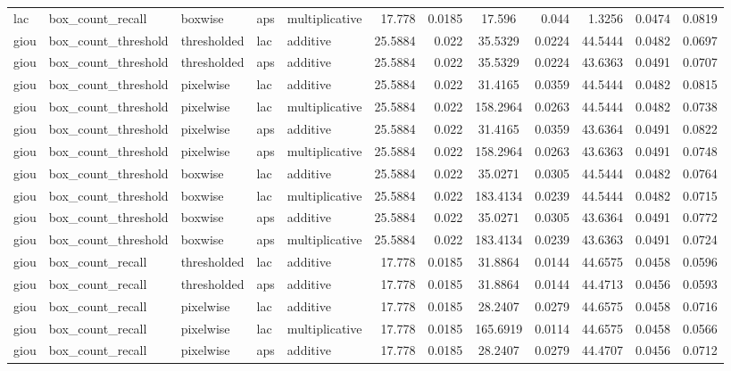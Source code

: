 \begin{table*}[htbp]
\begin{tabular}{@{}lllll rrcrrcr@{}}
lac & box\_count\_recall & boxwise & aps & multiplicative & 17.778 & 0.0185 & 17.596 & 0.044 & 1.3256 & 0.0474 & 0.0819 \\
giou & box\_count\_threshold & thresholded & lac & additive & 25.5884 & 0.022 & 35.5329 & 0.0224 & 44.5444 & 0.0482 & 0.0697 \\
giou & box\_count\_threshold & thresholded & aps & additive & 25.5884 & 0.022 & 35.5329 & 0.0224 & 43.6363 & 0.0491 & 0.0707 \\
giou & box\_count\_threshold & pixelwise & lac & additive & 25.5884 & 0.022 & 31.4165 & 0.0359 & 44.5444 & 0.0482 & 0.0815 \\
giou & box\_count\_threshold & pixelwise & lac & multiplicative & 25.5884 & 0.022 & 158.2964 & 0.0263 & 44.5444 & 0.0482 & 0.0738 \\
giou & box\_count\_threshold & pixelwise & aps & additive & 25.5884 & 0.022 & 31.4165 & 0.0359 & 43.6364 & 0.0491 & 0.0822 \\
giou & box\_count\_threshold & pixelwise & aps & multiplicative & 25.5884 & 0.022 & 158.2964 & 0.0263 & 43.6363 & 0.0491 & 0.0748 \\
giou & box\_count\_threshold & boxwise & lac & additive & 25.5884 & 0.022 & 35.0271 & 0.0305 & 44.5444 & 0.0482 & 0.0764 \\
giou & box\_count\_threshold & boxwise & lac & multiplicative & 25.5884 & 0.022 & 183.4134 & 0.0239 & 44.5444 & 0.0482 & 0.0715 \\
giou & box\_count\_threshold & boxwise & aps & additive & 25.5884 & 0.022 & 35.0271 & 0.0305 & 43.6364 & 0.0491 & 0.0772 \\
giou & box\_count\_threshold & boxwise & aps & multiplicative & 25.5884 & 0.022 & 183.4134 & 0.0239 & 43.6363 & 0.0491 & 0.0724 \\
giou & box\_count\_recall & thresholded & lac & additive & 17.778 & 0.0185 & 31.8864 & 0.0144 & 44.6575 & 0.0458 & 0.0596 \\
giou & box\_count\_recall & thresholded & aps & additive & 17.778 & 0.0185 & 31.8864 & 0.0144 & 44.4713 & 0.0456 & 0.0593 \\
giou & box\_count\_recall & pixelwise & lac & additive & 17.778 & 0.0185 & 28.2407 & 0.0279 & 44.6575 & 0.0458 & 0.0716 \\
giou & box\_count\_recall & pixelwise & lac & multiplicative & 17.778 & 0.0185 & 165.6919 & 0.0114 & 44.6575 & 0.0458 & 0.0566 \\
giou & box\_count\_recall & pixelwise & aps & additive & 17.778 & 0.0185 & 28.2407 & 0.0279 & 44.4707 & 0.0456 & 0.0712 \\

\end{tabular}
\end{table*}
